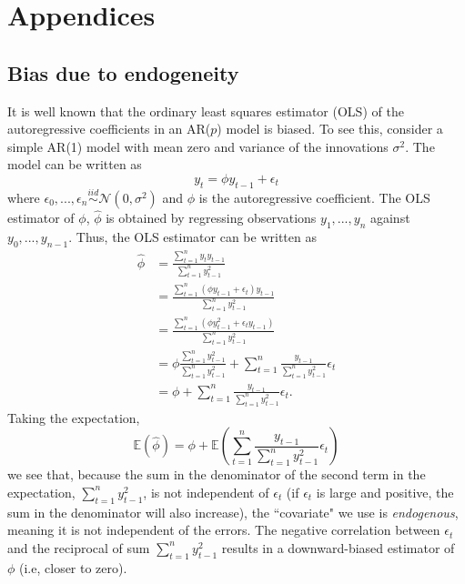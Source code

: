 \appendix

\section{Appendices}

\subsection{Bias due to endogeneity}

It is well known that the ordinary least squares estimator (OLS) of the autoregressive coefficients in an AR($p$) model is biased. To see this, consider a simple AR(1) model with mean zero and variance of the innovations $\sigma^2$. The model can be written as
$$
y_t = \phi y_{t-1} + \epsilon_t
$$
where $\epsilon_0, ..., \epsilon_n \overset{iid}{\sim} \mathcal{N}(0, \sigma^2)$ and $\phi$ is the autoregressive coefficient. The OLS estimator of $\phi$, $\hat{\phi}$ is obtained by regressing observations $y_1,...,y_n$ against $y_0,...,y_{n-1}$. Thus, the OLS estimator can be written as
\begin{equation*}
    \begin{aligned}
        \hat{\phi} &= \frac{\sum_{t=1}^n y_t y_{t-1}}{\sum_{t=1}^n y_{t-1}^2}\\
        &= \frac{\sum_{t=1}^n (\phi y_{t-1} + \epsilon_t) y_{t-1}}{\sum_{t=1}^n y_{t-1}^2}\\
        &= \frac{\sum_{t=1}^n (\phi y_{t-1}^2 + \epsilon_t y_{t-1})}{\sum_{t=1}^n y_{t-1}^2} \\
        &= \phi \frac{\sum_{t=1}^n y_{t-1}^2}{\sum_{t=1}^n y_{t-1}^2} + \sum_{t=1}^n \frac{y_{t-1}}{\sum_{t=1}^n y_{t-1}^2} \epsilon_t\\
        &= \phi + \sum_{t=1}^n \frac{y_{t-1}}{\sum_{t=1}^n y_{t-1}^2} \epsilon_t.
    \end{aligned}
\end{equation*}
Taking the expectation,
\begin{equation*}
    \mathbb{E}(\hat \phi) = \phi + \mathbb{E}\left(\sum_{t=1}^n \frac{y_{t-1}}{\sum_{t=1}^n y_{t-1}^2} \epsilon_t \right)
\end{equation*}
we see that, because the sum in the denominator of the second term in the expectation, $\sum_{t=1}^n y_{t-1}^2$, is not independent of $\epsilon_t$ (if $\epsilon_t$ is large and positive, the sum in the denominator will also increase), the ``covariate" we use is \textit{endogenous}, meaning it is not independent of the errors. The negative correlation between $\epsilon_t$ and the reciprocal of sum $\sum_{t=1}^n y_{t-1}^2$ results in a downward-biased estimator of $\phi$ (i.e, closer to zero). 

